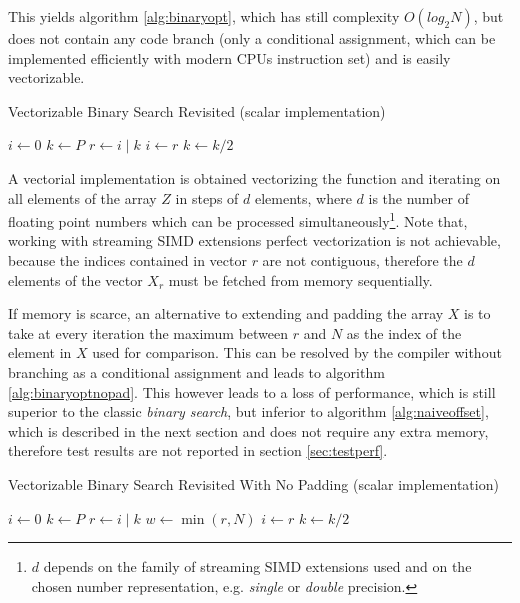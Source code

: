 \documentclass[preprint,1p,times]{elsarticle}
\begin{document}
This yields algorithm \ref{alg:binaryopt}, which has still complexity $O(log_2N)$, 
but does not contain any code branch 
(only a conditional assignment, which can be implemented efficiently with modern CPUs instruction set)
and is easily vectorizable.

\begin{algorithm}
\caption{Vectorizable Binary Search Revisited (scalar implementation)}
\label{alg:binaryopt}
\begin{algorithmic}
 
\State $i \leftarrow 0$
\State $k \leftarrow P$
\Repeat
    \State $r \leftarrow i\;|\;k$ 
        \State $i \leftarrow r$    
    \EndIf
	\State $k \leftarrow k / 2$ 
\EndFunction
\end{algorithmic}
\end{algorithm}

A vectorial implementation is obtained vectorizing the function and iterating on all elements of the 
array $Z$ in steps of $d$ elements, where $d$ is the number of floating point numbers which can be processed simultaneously\footnote{$d$ depends on the family of streaming SIMD extensions used and on the chosen number representation, 
e.g. \textit{single} or \textit{double} precision.}. Note that, working with streaming SIMD extensions perfect vectorization is not achievable, because the indices contained in vector $r$ are not contiguous, therefore the $d$ elements of the vector $X_r$ must be fetched from memory sequentially.

If memory is scarce, an alternative to extending and padding the array $X$ is to take at every iteration the maximum between $r$ and $N$ as the index of the element in $X$ used for comparison. This can be resolved by the compiler without branching as a conditional assignment and leads to algorithm \ref{alg:binaryoptnopad}. This however leads to a loss of performance, which is still superior to the classic \textit{binary search}, but inferior to algorithm \ref{alg:naiveoffset}, which is described in the next section and does not require any extra memory, therefore test results are not reported in section \ref{sec:testperf}.

\begin{algorithm}
\caption{Vectorizable Binary Search Revisited With No Padding (scalar implementation)}
\label{alg:binaryoptnopad}
\begin{algorithmic}
 
\State $i \leftarrow 0$
\State $k \leftarrow P$
\Repeat
    \State $r \leftarrow i\;|\;k$ 
    \State $w \leftarrow \min(r,N)$  
        \State $i \leftarrow r$    
    \EndIf
	\State $k \leftarrow k / 2$ 
\EndFunction
\end{algorithmic}
\end{algorithm}
\end{document}
